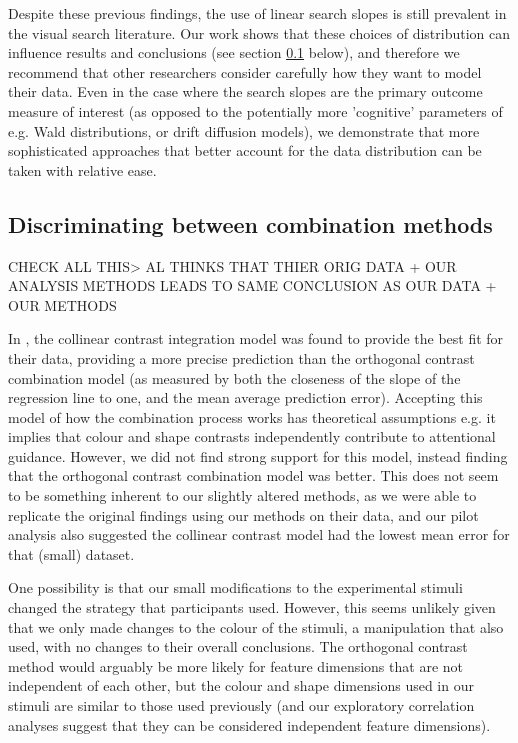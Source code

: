 \documentclass[preprint,12pt,authoryear]{elsarticle}
\begin{document}
Despite these previous findings, the use of linear search slopes is still prevalent in the visual search literature. Our work shows that these choices of distribution can influence results and conclusions (see section \ref{sec:dis_combmethods} below), and therefore we recommend that other researchers consider carefully how they want to model their data. Even in the case where the search slopes are the primary outcome measure of interest (as opposed to the potentially more 'cognitive' parameters of e.g. Wald distributions, or drift diffusion models), we demonstrate that more sophisticated approaches that better account for the data distribution can be taken with relative ease.


\subsection{Discriminating between combination methods}
\label{sec:dis_combmethods}

CHECK ALL THIS> AL THINKS  THAT THIER ORIG DATA + OUR ANALYSIS METHODS LEADS TO SAME CONCLUSION AS OUR DATA + OUR METHODS 

In \cite{buetti2019predicting}, the collinear contrast integration model was found to provide the best fit for their data, providing a more precise prediction than the orthogonal contrast combination model (as measured by both the closeness of the slope of the regression line to one, and the mean average prediction error). Accepting this model of how the combination process works has theoretical assumptions e.g. it implies that colour and shape contrasts independently contribute to attentional guidance. However, we did not find strong support for this model, instead finding that the orthogonal contrast combination model was better. This does not seem to be something inherent to our slightly altered methods, as we were able to replicate the original \cite{buetti2019predicting} findings using our methods on their data, and our pilot analysis also suggested the collinear contrast model had the lowest mean error for that (small) dataset.

One possibility is that our small modifications to the experimental stimuli changed the strategy that participants used. However, this seems unlikely given that we only made changes to the colour of the stimuli, a manipulation that \cite{buetti2019predicting} also used, with no changes to their overall conclusions. The orthogonal contrast method would arguably be more likely for feature dimensions that are not independent of each other, but the colour and shape dimensions used in our stimuli are similar to those used previously (and our exploratory correlation analyses suggest that they can be considered independent feature dimensions).
\end{document}
